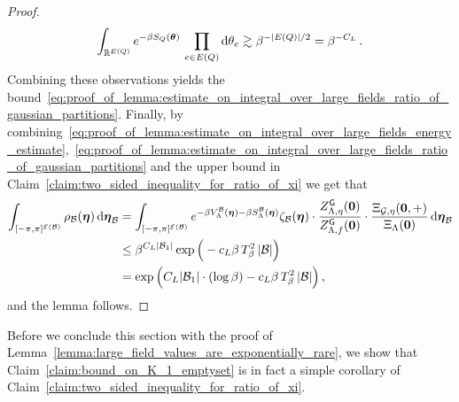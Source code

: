 \documentclass[11pt]{article}
\theoremstyle{definition}
\theoremstyle{remark}
\numberwithin{theorem}{section}
\newcommand{\bR}{\mathbb R}
\newcommand{\cE}{\mathcal{E}}
\begin{document}
\begin{proof}
        \[
        \int_{\bR^{E(Q)}} e^{-\beta S_{Q}(\boldsymbol{\theta})} \, \prod_{e\in E(Q)} {\rm d} \theta_e \gtrsim \beta^{-|E(Q)|/2}  = \beta^{-C_L} \, .
        \]
        Combining these observations yields the bound~\eqref{eq:proof_of_lemma:estimate_on_integral_over_large_fields_ratio_of_gaussian_partitions}. Finally, by combining~\eqref{eq:proof_of_lemma:estimate_on_integral_over_large_fields_energy_estimate},~\eqref{eq:proof_of_lemma:estimate_on_integral_over_large_fields_ratio_of_gaussian_partitions} and the upper bound in Claim~\ref{claim:two_sided_inequality_for_ratio_of_xi} we get that
        \begin{align*}
            \int_{[-\pi,\pi]^{\cE(\mathcal{B})}} \rho_{\mathcal{B}}(\boldsymbol{\eta}) \, {\rm d} \boldsymbol{\eta}_{\mathcal{B}} & = \int_{[-\pi,\pi]^{\cE(\mathcal{B})}}  e^{-\beta V_{\Lambda}^{\mathcal{B}}(\boldsymbol{\eta})- \beta S_{\Lambda}^{\mathcal{B}}(\boldsymbol{\eta})}\zeta_{\mathcal{B}}(\boldsymbol{\eta}) \cdot \frac{Z_{\Lambda,\eta}^{\sf G}(\mathbf{0})}{Z_{\Lambda,f}^{\sf G}(\mathbf{0})} \cdot \frac{\Xi_{\mathcal{G},\eta}(\mathbf{0},+)}{\Xi_{\Lambda}(\mathbf{0})}  \, {\rm d} \boldsymbol{\eta}_{\mathcal{B}}  \\ & \le \beta^{C_L|\mathcal{B}_1|} \exp\Big(- c_L \beta \, T_\beta^2  \, |\mathcal{B}| \Big) \\ &=  \exp\Big( C_L |\mathcal{B}_1| \cdot (\log \beta) - c_L \beta \, T_\beta^2  \, |\mathcal{B}| \Big) \, ,
        \end{align*}
        and the lemma follows. 
    \end{proof}
    \noindent
    Before we conclude this section with the proof of Lemma~\ref{lemma:large_field_values_are_exponentially_rare}, we show that Claim~\ref{claim:bound_on_K_1_emptyset} is in fact a simple corollary of Claim~\ref{claim:two_sided_inequality_for_ratio_of_xi}. 
\end{document}
